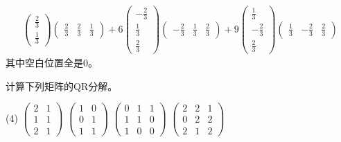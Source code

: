 \documentclass[12pt, a4paper, oneside, UTF8]{ctexbook}
\begin{document}
\begin{solution}
\begin{enumerate}[label=(\arabic*)]
\begin{align*}
\begin{pmatrix}
                \frac{2}{3} \\
                \frac{1}{3} 
            \end{pmatrix}\begin{pmatrix}
                \frac{2}{3} & \frac{2}{3} &\frac{1}{3} 
            \end{pmatrix}+6\begin{pmatrix}
                -\frac{2}{3}\\
                \frac{1}{3}\\
                \frac{2}{3}
            \end{pmatrix}\begin{pmatrix}
                -\frac{2}{3} & \frac{1}{3}& \frac{2}{3}
            \end{pmatrix}+9\begin{pmatrix}
                \frac{1}{3} \\
                -\frac{2}{3}\\
                \frac{2}{3}
            \end{pmatrix}\begin{pmatrix}
                \frac{1}{3} & -\frac{2}{3}&\frac{2}{3}
            \end{pmatrix}
        \end{align*}
        其中空白位置全是$0$。
    \end{enumerate}
\end{solution}

\begin{question}
    计算下列矩阵的QR分解。
    \begin{tasks}[label=(\arabic*)](4)
        \task $\begin{pmatrix}
            2&1\\
            1&1\\
            2&1
        \end{pmatrix}$
        \task $\begin{pmatrix}
            1&0\\
            0&1\\
            1&1
        \end{pmatrix}$
        \task $\begin{pmatrix}
            0&1&1\\
            1&1&0\\
            1&0&0
        \end{pmatrix}$
        \task $\begin{pmatrix}
            2&2&1\\
            0&2&2\\
            2&1&2
        \end{pmatrix}$
    \end{tasks}
\end{question}
\end{document}
